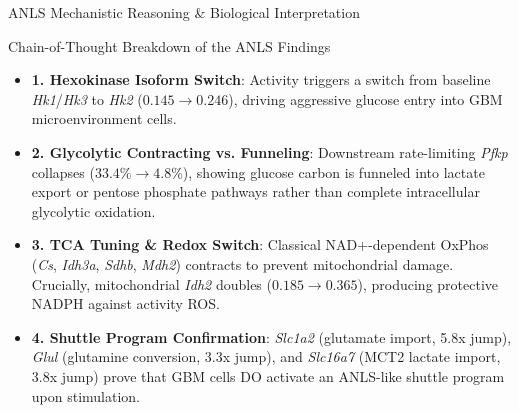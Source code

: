 \documentclass[10pt, aspectratio=169]{beamer}
\begin{document}
\begin{frame}{ANLS Mechanistic Reasoning \& Biological Interpretation}
  \begin{block}{Chain-of-Thought Breakdown of the ANLS Findings}
    \begin{itemize}
      \item \textbf{1. Hexokinase Isoform Switch}: Activity triggers a switch from baseline \emph{Hk1}/\emph{Hk3} to \emph{Hk2} ($0.145 \rightarrow 0.246$), driving aggressive glucose entry into GBM microenvironment cells.
      \item \textbf{2. Glycolytic Contracting vs. Funneling}: Downstream rate-limiting \emph{Pfkp} collapses ($33.4\% \rightarrow 4.8\%$), showing glucose carbon is funneled into lactate export or pentose phosphate pathways rather than complete intracellular glycolytic oxidation.
      \item \textbf{3. TCA Tuning \& Redox Switch}: Classical NAD+-dependent OxPhos (\emph{Cs}, \emph{Idh3a}, \emph{Sdhb}, \emph{Mdh2}) contracts to prevent mitochondrial damage. Crucially, mitochondrial \emph{Idh2} doubles ($0.185 \rightarrow 0.365$), producing protective NADPH against activity ROS.
      \item \textbf{4. Shuttle Program Confirmation}: \emph{Slc1a2} (glutamate import, 5.8x jump), \emph{Glul} (glutamine conversion, 3.3x jump), and \emph{Slc16a7} (MCT2 lactate import, 3.8x jump) prove that GBM cells DO activate an ANLS-like shuttle program upon stimulation.
    \end{itemize}
  \end{block}
\end{frame}
\end{document}
